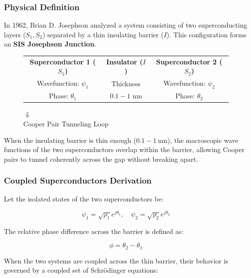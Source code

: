 \documentclass[
]{article}
\begin{document}
\subsubsection{Physical Definition}\label{physical-definition}

In 1962, Brian D. Josephson analyzed a system consisting of two
superconducting layers (\(S_1, S_2\)) separated by a thin insulating
barrier (\(I\)). This configuration forms an \textbf{SIS Josephson
Junction}.

\begin{figure}[h]
\centering
\renewcommand{\arraystretch}{1.3}
\begin{tabular}{|c|c|c|}
\hline
\textbf{Superconductor 1 ($S_1$)} & \textbf{Insulator ($I$)} & \textbf{Superconductor 2 ($S_2$)} \\
Wavefunction: $\psi_1$            & Thickness                & Wavefunction: $\psi_2$            \\
Phase: $\theta_1$                 & $0.1 - 1\text{ nm}$      & Phase: $\theta_2$                 \\
\hline
\end{tabular}

\vspace{0.3cm}
$\Downarrow$ \\
\vspace{0.1cm}
Cooper Pair Tunneling Loop
\end{figure}

When the insulating barrier is thin enough (\(0.1-1\ \text{nm}\)), the
macroscopic wave functions of the two superconductors overlap within the
barrier, allowing Cooper pairs to tunnel coherently across the gap
without breaking apart.

\subsubsection{Coupled Superconductors
Derivation}\label{coupled-superconductors-derivation}

Let the isolated states of the two superconductors be:

\[\psi_1 = \sqrt{\rho_1} e^{j\theta_1}, \quad \psi_2 = \sqrt{\rho_2} e^{j\theta_2}\]

The relative phase difference across the barrier is defined as:

\[\phi = \theta_2 - \theta_1\]

When the two systems are coupled across the thin barrier, their behavior
is governed by a coupled set of Schrödinger equations:
\end{document}
